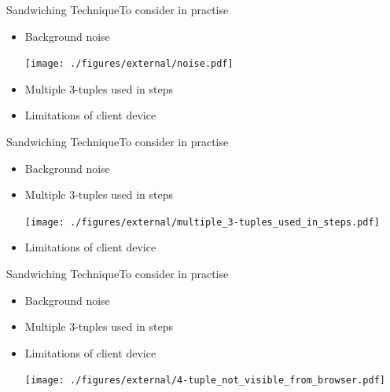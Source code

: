 \documentclass[aspectratio=169, hyperref={colorlinks=true, allcolors=SecondaryColor}, c]{beamer}
\begin{document}
	\begin{frame}[fragile, t]{Sandwiching Technique}{To consider in practise}
		\begin{itemize}
			\item \alert{Background noise}

			\texttt{[image: ./figures/external/noise.pdf]} %
			\item \alert{Multiple 3-tuples used in steps}

			\item \alert{Limitations of client device}

		\end{itemize}
	\end{frame}

	\begin{frame}[fragile, t]{Sandwiching Technique}{To consider in practise}
		\begin{itemize}
			\item \alert{Background noise}

			\item \alert{Multiple 3-tuples used in steps}

			\texttt{[image: ./figures/external/multiple\_3-tuples\_used\_in\_steps.pdf]} %
			\item \alert{Limitations of client device}

		\end{itemize}
	\end{frame}

	\begin{frame}[fragile, t]{Sandwiching Technique}{To consider in practise}
		\begin{itemize}
			\item \alert{Background noise}

			\item \alert{Multiple 3-tuples used in steps}

			\item \alert{Limitations of client device}

			\texttt{[image: ./figures/external/4-tuple\_not\_visible\_from\_browser.pdf]} %
		\end{itemize}
	\end{frame}
\else
\fi
\end{document}
